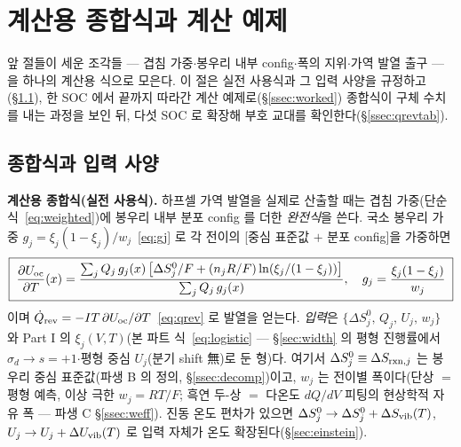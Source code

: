 \section{계산용 종합식과 계산 예제}\label{sec:synthesis}

앞 절들이 세운 조각들 --- 겹침 가중$\cdot$봉우리 내부 config$\cdot$폭의 지위$\cdot$가역 발열 출구 --- 을 하나의
계산용 식으로 모은다. 이 절은 실전 사용식과 그 입력 사양을 규정하고(\S\ref{ssec:synth}), 한 SOC 에서 끝까지
따라간 계산 예제로(\S\ref{ssec:worked}) 종합식이 구체 수치를 내는 과정을 보인 뒤, 다섯 SOC 로 확장해 부호
교대를 확인한다(\S\ref{ssec:qrevtab}).

\subsection{종합식과 입력 사양}\label{ssec:synth}
\begin{keybox}
\textbf{계산용 종합식(실전 사용식).} 하프셀 가역 발열을 실제로 산출할 때는 겹침 가중(단순식~\eqref{eq:weighted})에
봉우리 내부 분포 config 를 더한 \emph{완전식}을 쓴다. 국소 봉우리 가중 $g_j=\xi_j(1-\xi_j)/w_j$~\eqref{eq:gj}
로 각 전이의 [중심 표준값 $+$ 분포 config]을 가중하면
\begin{equation}
\boxed{\;\frac{\partial U_{\mathrm{oc}}}{\partial T}(x)
=\frac{\sum_j Q_j\,g_j(x)\,\bigl[\Delta S^0_j/F+(n_jR/F)\ln(\xi_j/(1-\xi_j))\bigr]}{\sum_j Q_j\,g_j(x)},\quad
g_j=\frac{\xi_j(1-\xi_j)}{w_j}\;}
\label{eq:complete}
\end{equation}
이며 $\dot Q_{\mathrm{rev}}=-IT\,\partial U_{\mathrm{oc}}/\partial T$~\eqref{eq:qrev} 로 발열을 얻는다. \emph{입력}은
$\{\Delta S^0_j,\,Q_j,\,U_j,\,w_j\}$ 와 Part I 의 $\xi_j(V,T)$(본 파트 식~\eqref{eq:logistic} --- \S\ref{sec:width}
의 평형 진행률에서 $\sigma_d\to s{=}+1$$\cdot$평형 중심 $U_j$(분기 shift 無)로 둔 형)다. 여기서
$\Delta S^0_j\equiv\Delta S_{\mathrm{rxn},j}$ 는 봉우리 중심 표준값(파생 B 의 정의, \S\ref{ssec:decomp})이고, $w_j$ 는
전이별 폭이다(단상 $=$ 평형 예측, 이상 극한 $w_j{=}RT/F$; 흑연 두-상 $=$ 다온도 $dQ/dV$ 피팅의 현상학적 자유
폭 --- 파생 C \S\ref{ssec:weff}). 진동 온도 편차가 있으면 $\Delta S^0_j\to\Delta S^0_j+\Delta S_{\mathrm{vib}}(T)$,
$U_j\to U_j+\Delta U_{\mathrm{vib}}(T)$ 로 입력 자체가 온도 확장된다(\S\ref{sec:einstein}).
\end{keybox}


